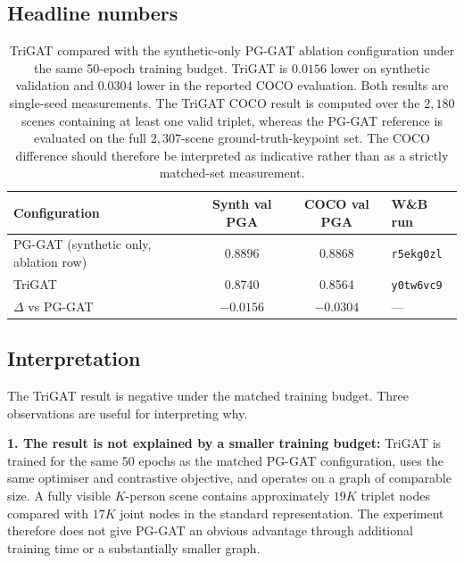 \subsection{Headline numbers}
\label{sec_res_trigat_numbers}

\begin{table}[H]
\centering
\caption[TriGAT compared with the synthetic-only PG-GAT ablation configuration under a matched 50-epoch training budget.]{TriGAT compared with the synthetic-only PG-GAT ablation
configuration under the same 50-epoch training budget. TriGAT is
$0.0156$ lower on synthetic validation and $0.0304$ lower in the
reported COCO evaluation. Both results are single-seed measurements.
The TriGAT COCO result is computed over the $2{,}180$ scenes containing
at least one valid triplet, whereas the PG-GAT reference is evaluated
on the full $2{,}307$-scene ground-truth-keypoint set. The COCO
difference should therefore be interpreted as indicative rather than
as a strictly matched-set measurement.}
\label{tab:trigat_headline}
\tablesize
\begin{tabular}{lccl}
\toprule
Configuration & Synth val PGA & COCO val PGA & W\&B run \\
\midrule
PG-GAT (synthetic only, ablation row)
    & 0.8896 & 0.8868 & \texttt{r5ekg0zl} \\
TriGAT
    & 0.8740 & 0.8564 & \texttt{y0tw6vc9} \\
$\Delta$ vs PG-GAT
    & $-0.0156$ & $-0.0304$ & --- \\
\bottomrule
\end{tabular}
\end{table}

\subsection{Interpretation}
\label{sec_res_trigat_discussion}

The TriGAT result is negative under the matched training budget.
Three observations are useful for interpreting why.

\textbf{1. The result is not explained by a smaller training budget:}
TriGAT is trained for the same 50 epochs as the matched PG-GAT
configuration,
uses the same optimiser and contrastive objective,
and operates on a graph of comparable size.
A fully visible $K$-person scene contains approximately $19K$ triplet
nodes compared with $17K$ joint nodes in the standard representation.
The experiment therefore does not give PG-GAT an obvious advantage
through additional training time or a substantially smaller graph.

